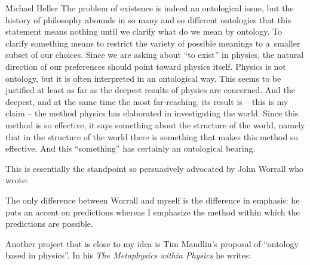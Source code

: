 \begin{artengenv}{Michael Heller}
The problem of existence is indeed an ontological issue, but the history of philosophy abounds in so many and so
different ontologies that this statement means nothing until we clarify what do we mean by ontology. To clarify
something means to restrict the variety of possible meanings to a~smaller subset of our choices. Since we are asking
about ``to exist'' in physics, the natural direction of our preferences should point toward physics itself. Physics is
not ontology, but it is often interpreted in an ontological way. This seems to be justified at least as far as the
deepest results of physics are concerned. And the deepest, and at the same time the most far-reaching, its result is –
this is my claim – the method physics has elaborated in investigating the world. Since this method is so effective, it
says something about the structure of the world, namely that in the structure of the world there is something that
makes this method so effective. And this ``something'' has certainly an ontological bearing.

This is essentially the standpoint so persuasively advocated by John Worrall who wrote:

The only difference between Worrall and myself is the difference in emphasis: he puts an accent on predictions whereas I
emphasize the method within which the predictions are possible.

Another project that is close to my idea is Tim Maudlin’s proposal of ``ontology based in physics''. In his
\textit{The Metaphysics within Physics} he writes:



\end{artengenv}
